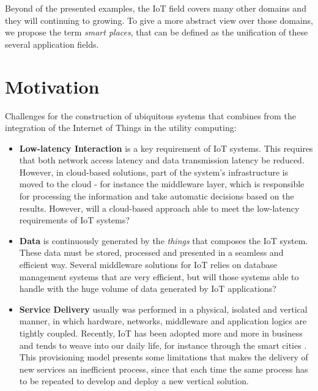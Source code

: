 Beyond of the presented examples, the \gls{IoT} field covers many other domains and they will
continuing to growing. To give a more abstract view over those domains, we propose the term
\textit{smart places}, that can be defined as the unification of these several application fields.

\section{Motivation}
\label{section:motivation}
Challenges \cite{caceres2012ubicomp} for the construction of ubiquitous systems that combines from
the integration of the Internet of Things in the utility computing:

\begin{itemize}
  \item \textbf{Low-latency Interaction} is a key requirement of \gls{IoT} systems. This requires that
  both network access latency and data transmission latency be reduced. However, in cloud-based solutions,
  part of the system's infrastructure is moved to the cloud - for instance the middleware layer,
  which is responsible for processing the information and take automatic decisions based on the results.
  However, will a cloud-based approach able to meet the low-latency requirements of \gls{IoT} systems?
  \item \textbf{Data} is continuously generated by the \textit{things} that composes the \gls{IoT}
  system. These data must be stored, processed and presented in a seamless and efficient way.
  Several middleware solutions for \gls{IoT} \cite{floerkemeier2007rfid}\cite{eisenhauer2010hydra}\cite{de2008socrades}
  relies on database management systems that are very efficient, but will those systems able to
  handle with the huge volume of data generated by \gls{IoT} applications?
  \item \textbf{Service Delivery} usually was performed in a physical, isolated and vertical
  manner, in which hardware, networks, middleware and application logics are tightly coupled. Recently,
  \gls{IoT} has been adopted more and more in business and tends to weave into our daily life, for instance
  through the smart cities \cite{caragliu2011smart}\cite{schaffers2011smart}. This provisioning model presents some
  limitations that makes the delivery of new services an inefficient process, since that each time the
  same process has to be repeated to develop and deploy a new vertical solution.

\end{itemize}
